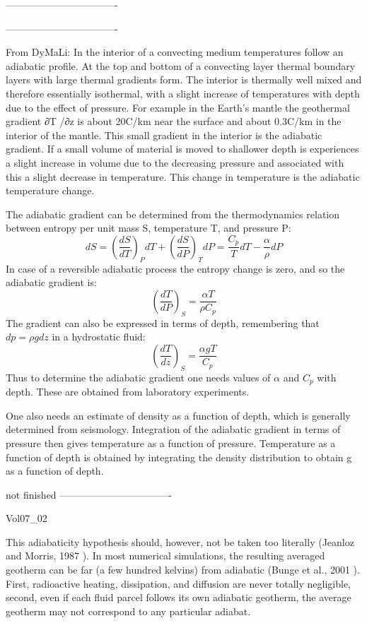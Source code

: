 ----------------------------------


----------------------------------

From DyMaLi: In the interior of a convecting medium temperatures follow an adiabatic profile. 
At the top and bottom of a convecting layer thermal boundary layers with large thermal gradients form. 
The interior is thermally well mixed and therefore essentially isothermal, with a slight increase 
of temperatures with depth due to the effect of pressure.
For example in the Earth’s mantle the geothermal gradient ∂T /∂z is about 20C/km near the 
surface and about 0.3C/km in the interior of the mantle. This small gradient in the 
interior is the adiabatic gradient. If a small
volume of material is moved to shallower depth is experiences a slight increase in volume 
due to the decreasing pressure and associated with this a slight decrease in temperature. 
This change in temperature is the adiabatic temperature change.

The adiabatic gradient can be determined from the thermodynamics relation between entropy per unit mass S,
temperature T, and pressure P:
\[
dS = \left( \frac{dS}{dT}\right)_P dT +  \left( \frac{dS}{dP}\right)_T dP
=
\frac{C_p }{T} dT - \frac{\alpha}{\rho} dP
\]
In case of a reversible adiabatic process the entropy change is zero, and so the adiabatic gradient is:
\[
\left( \frac{dT}{dP}\right)_S = \frac{\alpha T}{\rho C_p} 
\]
The gradient can also be expressed in terms of depth, remembering that $d p = \rho gdz$ 
in a hydrostatic fluid:
\[
\left( \frac{dT}{dz}\right)_S = \frac{\alpha g T}{C_p} 
\]
Thus to determine the adiabatic gradient one needs values of $\alpha$ 
and $C_p$ with depth. These are obtained from laboratory experiments.

One also needs an estimate of density as a function of depth, which is generally determined
from seismology. 
Integration of the adiabatic gradient in terms of pressure then gives
temperature as a function of pressure. 
Temperature as a function of depth is obtained by integrating the density
distribution to obtain g as a function of depth.

not finished
----------------------------------

Vol07\_02

This adiabaticity hypothesis should, however, not
be taken too literally (Jeanloz and Morris, 1987 \cite{jemo87}). In
most numerical simulations, the resulting averaged
geotherm can be far (a few hundred kelvins) from
adiabatic (Bunge et al., 2001 \cite{burm01}). First, radioactive 
heating, dissipation, and diffusion are never totally
negligible, second, even if each fluid parcel follows
its own adiabatic geotherm, the average geotherm
may not correspond to any particular adiabat.



